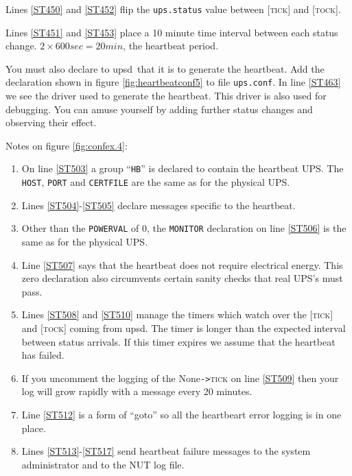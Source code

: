\documentclass[12pt]{article}
\newcommand{\upsd}{\mbox{\textcolor{UPSDCOLOUR}{upsd}}}
\newcommand{\None}{\textcolor{UPSMONCOLOUR}{\textsf{None}}}
\newcommand{\TICK}{\textcolor{UPSMONCOLOUR}{\textsc{tick}}}
\newcommand{\TOCK}{\textcolor{UPSMONCOLOUR}{\textsc{tock}}}
\newcommand{\status}[1]{\textcolor{UPSDCOLOUR}{[{#1}]}}
\newcommand{\EVENT}[2]{\textcolor{MONCOLOUR}{#1}{\allowbreak}\texttt{\textcolor{MONCOLOUR}{->}}{\allowbreak}\textcolor{MONCOLOUR}{#2}}
\newcommand{\upsconf}{\textcolor{UPSDCOLOUR}{\texttt{ups.conf}}}
\newcommand{\ol}{\begin{enumerate}%
   \setlength{\itemsep}{0em}}
\newcommand{\eol}{\end{enumerate}}
\newcommand{\li}{\item}                 %
\begin{document}
Lines \ref{ST450} and \ref{ST452} flip the \texttt{ups.status} value between
\status{\TICK} and \status{\TOCK}.

Lines \ref{ST451} and \ref{ST453} place a 10 minute time interval between each
status change. $2\times 600 sec = 20 min$, the heartbeat period.

You must also declare to \upsd\ that it is to generate the heartbeat.  Add the
declaration shown in figure \ref{fig:heartbeatconf5} to file \upsconf.  In
line \ref{ST463} we see the driver used to generate the heartbeat.  This
driver is also used for debugging.  You can amuse yourself by adding further
status changes and observing their effect.

\vspace{6mm}
Notes on figure \ref{fig:confex.4}:
\vspace{3mm}

\ol

\li On line \ref{ST503} a group ``\texttt{HB}'' is declared to contain the
heartbeat UPS.  The \texttt{HOST}, \texttt{PORT} and \texttt{CERTFILE} are the
same as for the physical UPS.

\li Lines \ref{ST504}-\ref{ST505} declare messages specific to the heartbeat.

\li Other than the \texttt{POWERVAL} of 0, the \texttt{MONITOR} declaration on
line \ref{ST506} is the same as for the physical UPS.

\li Line \ref{ST507} says that the heartbeat does not require electrical
energy.  This zero declaration also circumvents certain sanity checks that
real UPS's must pass.

\li Lines \ref{ST508} and \ref{ST510} manage the timers which watch over the
\status{\TICK} and \status{\TOCK} coming from \upsd.  The timer is longer
than the expected interval between status arrivals.  If this timer expires we
assume that the heartbeat has failed.

\li If you uncomment the logging of the \EVENT{\None}{\TICK} on line
\ref{ST509} then your log will grow rapidly with a message every 20
minutes.

\li Line \ref{ST512} is a form of ``goto'' so all the heartbeart error logging
is in one place.

\li Lines \ref{ST513}-\ref{ST517} send heartbeat failure messages to the
system administrator and to the NUT log file.

\eol
\end{document}
